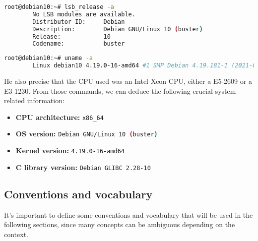     \begin{minipage}{\dimexpr\linewidth-20pt}
    \begin{lstlisting}[language=bash, caption={Command and logs of the Linux Standard Base Release used for the dataset generation}]
        root@debian10:~# lsb_release -a
        No LSB modules are available.
        Distributor ID:     Debian
        Description:        Debian GNU/Linux 10 (buster)
        Release:            10
        Codename:           buster
    \end{lstlisting}
    \end{minipage}

    \begin{minipage}{\dimexpr\linewidth-20pt}
    \begin{lstlisting}[language=bash, caption={Command and logs of the OS and kernel version used for the dataset generation}]
        root@debian10:~# uname -a
        Linux debian10 4.19.0-16-amd64 #1 SMP Debian 4.19.181-1 (2021-03-19) x86_64 GNU/Linux
    \end{lstlisting}
    \end{minipage}

    He also precise that the CPU used was an Intel Xeon CPU, either a E5-2609 or a E3-1230. From those commands, we can deduce the following crucial system related information:

    \begin{itemize}
        \item \textbf{CPU architecture:} \lstinline[language=bash]|x86_64|
        \item \textbf{OS version:} \lstinline[language=bash]|Debian GNU/Linux 10 (buster)|
        \item \textbf{Kernel version:} \lstinline[language=bash]|4.19.0-16-amd64|
        \item \textbf{C library version:} \lstinline[language=bash]|Debian GLIBC 2.28-10|
    \end{itemize}

    \subsection{Conventions and vocabulary}
    It's important to define some conventions and vocabulary that will be used in the following sections, since many concepts can be ambiguous depending on the context.

